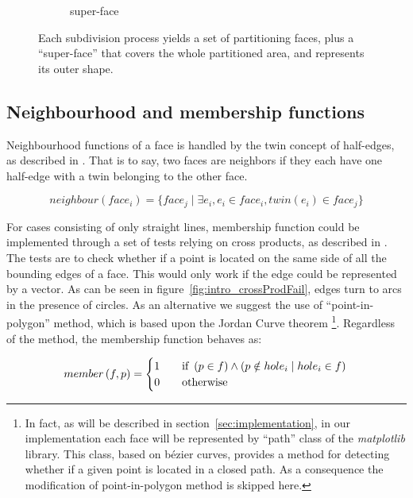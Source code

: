 \begin{figure}
\begin{subfigure}{.32\textwidth}
    \caption{super-face} \label{subfig:subd_superface_c}
  \end{subfigure}%
  \caption[xxx]
          {Each subdivision process yields a set of partitioning faces, plus a ``super-face'' that covers the whole partitioned area, and represents its outer shape.}
  \label{fig:subd_superface}
\end{figure}

\subsection{Neighbourhood and membership functions} \label{subsec:memberNeighbour}

Neighbourhood functions of a face is handled by the twin concept of half-edges, as described in \cite{de2000computational}.
That is to say, two faces are neighbors if they each have one half-edge with a twin belonging to the other face.

\[
neighbour\left(face_i\right) = \lbrace  face_j \mid \exists e_i, e_i \in face_i, \mathit{twin}(e_i) \in face_j \rbrace
\]

For cases consisting of only straight lines, membership function could be implemented through a set of tests relying on cross products, as described in \cite{de2000computational}.
The tests are to check whether if a point is located on the same side of all the bounding edges of a face.
This would only work if the edge could be represented by a vector.
As can be seen in figure~\ref{fig:intro_crossProdFail}, edges turn to arcs in the presence of circles.
As an alternative we suggest the use of ``point-in-polygon'' method, which is based upon the Jordan Curve theorem \footnote{In fact, as will be described in section~\ref{sec:implementation}, in our implementation each face will be represented by ``path'' class of the \emph{matplotlib} library. This class, based on b\'ezier curves, provides a method for detecting whether if a given point is located in a closed path. As a consequence the modification of point-in-polygon method is skipped here.}.
Regardless of the method, the membership function behaves as:

\[
member\left(f,p\right) =
\begin{cases}
  1 & \quad \text{if } \left(p \in f\right) \land \left(p \notin hole_i \mid hole_i \in f\right) \\
  0 & \quad \text{otherwise} \\
\end{cases}\\
\]

